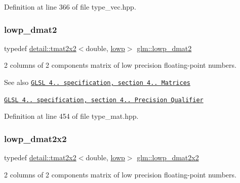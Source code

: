 Definition at line 366 of file type\+\_\+vec.\+hpp.

\mbox{\label{group__core__precision_ga5e08c45dfef867e0326a1eee95060cd0}} 
\subsubsection{\texorpdfstring{lowp\+\_\+dmat2}{lowp\_dmat2}}
{\footnotesize\ttfamily typedef \hyperlink{structglm_1_1detail_1_1tmat2x2}{detail\+::tmat2x2}$<$double, \hyperlink{namespaceglm_a0f04f086094c747d227af4425893f545ae161af3fc695e696ce3bf69f7332bc2d}{lowp}$>$ \hyperlink{group__core__precision_ga5e08c45dfef867e0326a1eee95060cd0}{glm\+::lowp\+\_\+dmat2}}

2 columns of 2 components matrix of low precision floating-\/point numbers.

\begin{DoxySeeAlso}{See also}
\href{http://www.opengl.org/registry/doc/GLSLangSpec.4.20.8.pdf}{\tt G\+L\+SL 4.. specification, section 4.. Matrices} 

\href{http://www.opengl.org/registry/doc/GLSLangSpec.4.20.8.pdf}{\tt G\+L\+SL 4.. specification, section 4.. Precision Qualifier} 
\end{DoxySeeAlso}


Definition at line 454 of file type\+\_\+mat.\+hpp.

\mbox{\label{group__core__precision_ga68b486ff22814c1a3781378513a9fcc0}} 
\subsubsection{\texorpdfstring{lowp\+\_\+dmat2x2}{lowp\_dmat2x2}}
{\footnotesize\ttfamily typedef \hyperlink{structglm_1_1detail_1_1tmat2x2}{detail\+::tmat2x2}$<$double, \hyperlink{namespaceglm_a0f04f086094c747d227af4425893f545ae161af3fc695e696ce3bf69f7332bc2d}{lowp}$>$ \hyperlink{group__core__precision_ga68b486ff22814c1a3781378513a9fcc0}{glm\+::lowp\+\_\+dmat2x2}}

2 columns of 2 components matrix of low precision floating-\/point numbers.

